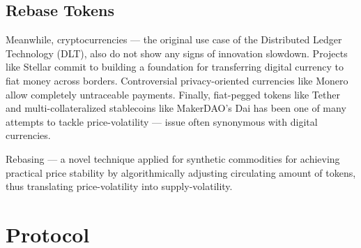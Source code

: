 \documentclass{article}
\begin{document}
\subsection{Rebase Tokens}

Meanwhile, cryptocurrencies --- the original use case of the Distributed Ledger Technology (DLT), also do not show any signs of innovation slowdown. Projects like Stellar \cite{mazieres2016stellar} commit to building a foundation for transferring digital currency to fiat money across borders. Controversial privacy-oriented currencies like Monero \cite{saberhagen2013monero} allow completely untraceable payments. Finally, fiat-pegged tokens like Tether \cite{tether2016} and multi-collateralized stablecoins like MakerDAO's Dai \cite{makerdao2020dai} has been one of many attempts to tackle price-volatility --- issue often synonymous with digital currencies.

Rebasing --- a novel technique applied for synthetic commodities for achieving practical price stability by algorithmically adjusting circulating amount of tokens, thus translating price-volatility into supply-volatility.

\section{Protocol}



\end{document}

